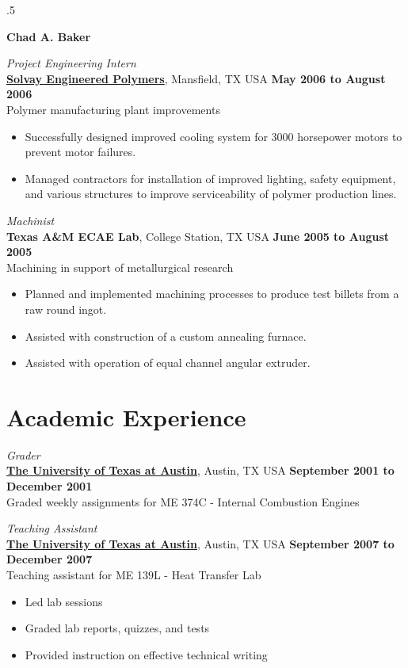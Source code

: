 \documentclass[centered]{res}
\begin{document}
\begin{resume}
\moveleft.5\hoffset\centerline{\large\bf Chad A. Baker}
%
\textit{Project Engineering Intern} \\
\href{http://www.lyondellbasell.com/LandingPages/SolvayEngineeredPolymers}{\textbf{Solvay
    Engineered Polymers}}, Mansfield, TX USA 
\hfill \textbf{May 2006 to August 2006} \\
Polymer manufacturing plant improvements 
\begin{itemize} \itemsep -2pt %
\item Successfully designed improved cooling system for 3000
  horsepower motors to prevent motor failures.
\item Managed contractors for installation of improved lighting,
  safety equipment, and various structures to improve serviceability
  of polymer production lines.
\end{itemize} 
%
\textit{Machinist} \\
\textbf{Texas A\&M ECAE Lab}, College Station, TX USA
\hfill \textbf{June 2005 to August 2005} \\
Machining in support of metallurgical research 
\begin{itemize} \itemsep -2pt %
\item Planned and implemented machining processes to produce test
  billets from a raw round ingot.
\item Assisted with construction of a custom annealing furnace.
\item Assisted with operation of equal channel angular extruder.
\end{itemize}   

\section{Academic Experience}
\label{sec:teaching}

\textit{Grader} \\
\href{http://www.utexas.edu/}{\textbf{The University of Texas at
    Austin}}, Austin, TX USA
\hfill \textbf{September 2001 to December 2001} \\
Graded weekly assignments for ME 374C - Internal Combustion Engines 

\textit{Teaching Assistant} \\
\href{http://www.utexas.edu/}{\textbf{The University of Texas at
    Austin}}, Austin, TX USA
\hfill \textbf{September 2007 to December 2007} \\
Teaching assistant for ME 139L - Heat Transfer Lab
\begin{itemize} \itemsep -2pt
\item Led lab sessions 
\item Graded lab reports, quizzes, and tests
\item Provided instruction on effective technical writing
\end{itemize}


\end{resume}
\end{document}
